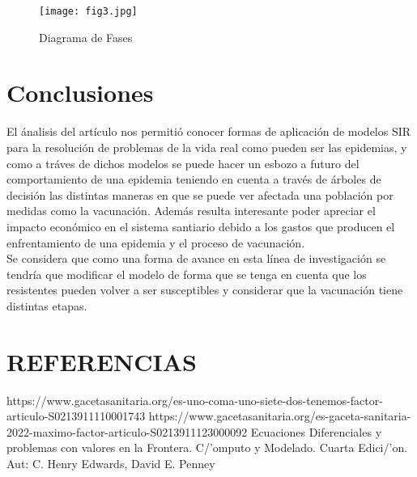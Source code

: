 \documentclass{wscpaperproc}
\theoremstyle{wsc}
\begin{document}
\begin{figure}[h!]
	\texttt{[image: fig3.jpg]}
	\caption{Diagrama de Fases }
\end{figure}


\clearpage
\section*{Conclusiones}
El ánalisis del artículo nos permitió conocer formas de aplicación de modelos SIR para la resolución
de problemas de la vida real como pueden ser las epidemias, y como a tr\'aves de dichos modelos
se puede hacer un esbozo a futuro del comportamiento de una epidemia teniendo en cuenta
a trav\'es de \'arboles de decisi\'on las distintas maneras en que se puede ver afectada una 
poblaci\'on por medidas como la vacunaci\'on. Adem\'as resulta interesante
poder apreciar el impacto econ\'omico en el sistema santiario debido a los gastos que producen el enfrentamiento
de una epidemia y el proceso de vacunaci\'on.\\
Se considera que como una forma de avance en esta l\'inea de investigaci\'on se tendr\'ia que modificar el modelo
de forma que se tenga en cuenta que los resistentes pueden volver a ser susceptibles y considerar que la vacunaci\'on 
tiene distintas etapas.\\

\section*{REFERENCIAS}
https://www.gacetasanitaria.org/es-uno-coma-uno-siete-dos-tenemos-factor-articulo-S0213911110001743
https://www.gacetasanitaria.org/es-gaceta-sanitaria-2022-maximo-factor-articulo-S0213911123000092
Ecuaciones Diferenciales y problemas con valores en la Frontera. C/'omputo y Modelado. Cuarta Edici/'on. Aut: C. Henry Edwards, David E. Penney

\appendix

\clearpage
\end{document}
